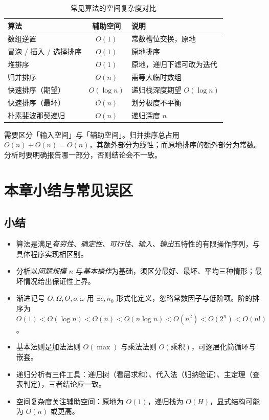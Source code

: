 \begin{table}[H]
\centering
\caption{常见算法的空间复杂度对比}
\label{tab:space}
\begin{tabularx}{\textwidth}{l c X}
\toprule
算法 & 辅助空间 & 说明 \\
\midrule
数组逆置 & $O(1)$ & 常数槽位交换，原地 \\
冒泡 / 插入 / 选择排序 & $O(1)$ & 原地排序 \\
堆排序 & $O(1)$ & 原地，递归下滤可改为迭代 \\
归并排序 & $O(n)$ & 需等大临时数组 \\
快速排序（期望） & $O(\log n)$ & 递归栈深度期望 $O(\log n)$ \\
快速排序（最坏） & $O(n)$ & 划分极度不平衡 \\
朴素斐波那契递归 & $O(n)$ & 递归深度 $n$ \\
\bottomrule
\end{tabularx}
\end{table}

需要区分「输入空间」与「辅助空间」。归并排序总占用 $O(n)+O(n)=O(n)$，其额外部分为线性；而原地排序的额外部分为常数。分析时要明确报告哪一部分，否则结论会不一致。

\section{本章小结与常见误区}

\subsection{小结}

\begin{itemize}
    \item 算法是满足\emph{有穷性、确定性、可行性、输入、输出}五特性的有限操作序列，与具体程序实现相区别。
    \item 分析以\emph{问题规模 $n$} 与\emph{基本操作}为基础，须区分最好、最坏、平均三种情形；最坏情况给出保证性上界。
    \item 渐进记号 $O,\Omega,\Theta,o,\omega$ 用 $\exists c,n_0$ 形式化定义，忽略常数因子与低阶项。阶的排序为 $O(1)<O(\log n)<O(n)<O(n\log n)<O(n^2)<O(2^n)<O(n!)$。
    \item 基本法则是加法法则 $O(\max)$ 与乘法法则 $O(\text{乘积})$，可逐层化简循环与嵌套。
    \item 递归分析有三件工具：递归树（看层求和）、代入法（归纳验证）、主定理（查表判定），三者结论应一致。
    \item 空间复杂度关注辅助空间：原地为 $O(1)$，递归栈为 $O(H)$，显式结构可能为 $O(n)$ 或更高。
\end{itemize}

